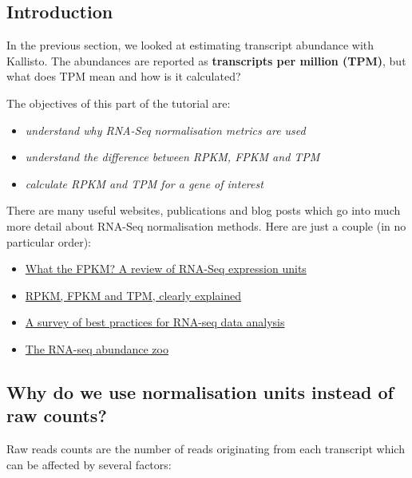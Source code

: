 \documentclass[11pt]{article}
\providecommand{\tightlist}{%
      \setlength{\itemsep}{0pt}\setlength{\parskip}{0pt}}
\begin{document}
\hypertarget{introduction}{%
\subsection{Introduction}\label{introduction}}

In the previous section, we looked at estimating transcript abundance
with Kallisto. The abundances are reported as \textbf{transcripts per
million (TPM)}, but what does TPM mean and how is it calculated?

The objectives of this part of the tutorial are:

\begin{itemize}
\tightlist
\item
  \textit{understand why RNA-Seq normalisation metrics are used}
\item
  \textit{understand the difference between RPKM, FPKM and TPM}
\item
  \textit{calculate RPKM and TPM for a gene of interest}
\end{itemize}

There are many useful websites, publications and blog posts which go
into much more detail about RNA-Seq normalisation methods. Here are just
a couple (in no particular order):

\begin{itemize}
\tightlist
\item
  \href{https://haroldpimentel.wordpress.com/2014/05/08/what-the-fpkm-a-review-rna-seq-expression-units/}{What
  the FPKM? A review of RNA-Seq expression units}
\item
  \href{https://statquest.org/2015/07/09/rpkm-fpkm-and-tpm-clearly-explained/}{RPKM,
  FPKM and TPM, clearly explained}
\item
  \href{https://www.ncbi.nlm.nih.gov/pmc/articles/PMC4728800/}{A survey
  of best practices for RNA-seq data analysis}
\item
  \href{http://robpatro.com/blog/?p=235}{The RNA-seq abundance zoo}
\end{itemize}

    \hypertarget{why-do-we-use-normalisation-units-instead-of-raw-counts}{%
\subsection{Why do we use normalisation units instead of raw
counts?}\label{why-do-we-use-normalisation-units-instead-of-raw-counts}}

Raw reads counts are the number of reads originating from each
transcript which can be affected by several factors:
\end{document}
